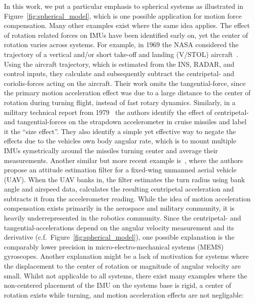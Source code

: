 \documentclass[journal]{IEEEtran}
\begin{document}
In this work, we put a particular emphasis to spherical systems as illustrated in Figure~\ref{fig:spherical_model}, which is one possible application for motion force compensation.
Many other examples exist where the same idea applies.
The effect of rotation related forces on IMUs have been identified early on, yet the center of rotation varies across systems.
For example, in 1969 the NASA considered the trajectory of a vertical and/or short take-off and landing (V/STOL) aircraft~\cite{ibm1969vstol_alt}.
Using the aircraft trajectory, which is estimated from the INS, RADAR, and control inputs, they calculate and subsequently subtract the centripetal- and coriolis-forces acting on the aircraft.
Their work omits the tangential-force, since the primary motion acceleration effect was due to a large distance to the center of rotation during turning flight, instead of fast rotary dynamics. 
Similarly, in a military technical report from 1979~\cite{hung1979size} the authors identify the effect of centripetal- and tangential-forces on the strapdown accelerometer in cruise missiles and label it the ``size effect''.  
They also identify a simple yet effective way to negate the effects due to the vehicles own body angular rate, which is to mount multiple IMUs symetrically around the missiles turning center and average their measurements. 
Another similar but more recent example is~\cite{euston2008complementary}, where the authors propose an attitude estimation filter for a fixed-wing unmanned aerial vehicle (UAV).
When the UAV banks in, the filter estimates the turn radius using bank angle and airspeed data, calculates the resulting centripetal acceleration and subtracts it from the accelerometer reading.   
While the idea of motion acceleration compensation exists primarily in the aerospace and military community, it is heavily underrepresented in the robotics community.
Since the centripetal- and tangential-accelerations depend on the angular velocity measurement and its derivative (c.f.~Figure~\ref{fig:spherical_model}), one possible explanation is the comparably lower precision in micro-electro-mechanical systems (MEMS) gyroscopes.
Another explanation might be a lack of motivation for systems where the displacement to the center of rotation or magnitude of angular velocity are small. 
Whilst not applicable to all systems, there exist many examples where the non-centered placement of the IMU on the systems base is rigid, a center of rotation exists while turning, and motion acceleration effects are not negligable:
\end{document}
